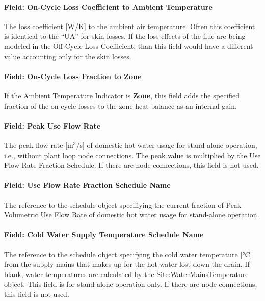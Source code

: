\paragraph{Field: On-Cycle Loss Coefficient to Ambient Temperature}\label{field-on-cycle-loss-coefficient-to-ambient-temperature}

The loss coefficient {[}W/K{]} to the ambient air temperature. Often this coefficient is identical to the ``UA'' for skin losses. If the loss effects of the flue are being modeled in the Off-Cycle Loss Coefficient, than this field would have a different value accounting only for the skin losses.

\paragraph{Field: On-Cycle Loss Fraction to Zone}\label{field-on-cycle-loss-fraction-to-zone}

If the Ambient Temperature Indicator is \textbf{Zone}, this field adds the specified fraction of the on-cycle losses to the zone heat balance as an internal gain.

\paragraph{Field: Peak Use Flow Rate}\label{field-peak-use-flow-rate}

The peak flow rate {[}m\(^{3}\)/s{]} of domestic hot water usage for stand-alone operation, i.e., without plant loop node connections. The peak value is multiplied by the Use Flow Rate Fraction Schedule. If there are node connections, this field is not used.

\paragraph{Field: Use Flow Rate Fraction Schedule Name}\label{field-use-flow-rate-fraction-schedule-name}

The reference to the schedule object specifiying the current fraction of Peak Volumetric Use Flow Rate of domestic hot water usage for stand-alone operation.

\paragraph{Field: Cold Water Supply Temperature Schedule Name}\label{field-cold-water-supply-temperature-schedule-name}

The reference to the schedule object specifying the cold water temperature {[}°C{]} from the supply mains that makes up for the hot water lost down the drain. If blank, water temperatures are calculated by the Site:WaterMainsTemperature object. This field is for stand-alone operation only. If there are node connections, this field is not used.

